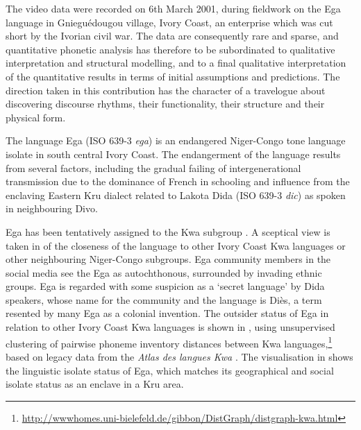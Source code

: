 \documentclass[output=paper,colorlinks,citecolor=brown]{langscibook}
\begin{document}
The video data were recorded on 6th March 2001, during fieldwork on the Ega language in Gnieguédougou village, Ivory Coast, an enterprise which was cut short by the Ivorian civil war. The data are consequently rare and sparse, and quantitative phonetic analysis has therefore to be subordinated to qualitative interpretation and structural modelling, and to a final qualitative interpretation of the quantitative results in terms of initial assumptions and predictions. The direction taken in this contribution has the character of a travelogue about discovering discourse rhythms, their functionality, their structure and their physical form.

The language Ega (ISO 639-3 \textit{ega}) is an endangered Niger-Congo tone language isolate in south central Ivory Coast. The endangerment of the language results from several factors, including the gradual failing of intergenerational transmission due to the dominance of French in schooling and influence from the enclaving Eastern Kru dialect related to Lakota Dida (ISO 639-3 \textit{dic}) as spoken in neighbouring Divo.

Ega has been tentatively assigned to the Kwa subgroup \citep{bolerichard1983, connellahouagibbon2002, salffner2004}. A sceptical view is taken in  of the closeness of the language to other Ivory Coast Kwa languages or other neighbouring Niger-Congo subgroups. Ega community members in the social media see the Ega as autochthonous, surrounded by invading ethnic groups. Ega is regarded with some suspicion as a `secret language' by Dida speakers, whose name for the community and the language is Diès, a term resented by many Ega as a colonial invention. The outsider status of Ega in relation to other Ivory Coast Kwa languages is shown in , using unsupervised clustering of pairwise phoneme inventory distances between Kwa languages,\footnote{\url{http://wwwhomes.uni-bielefeld.de/gibbon/DistGraph/distgraph-kwa.html}} based on legacy data from the \textit{Atlas des langues Kwa} \citep{herault1983}. The visualisation in  shows the linguistic isolate status of Ega, which matches its geographical and social isolate status as an enclave in a Kru area.
\end{document}
